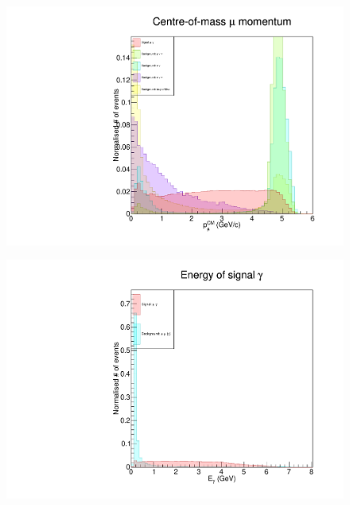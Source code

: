\documentclass[12pt]{thesis}  %
\begin{document}
\begin{figure}[h]
\centering
\begin{minipage}{.5\textwidth}
  \centering
  \includegraphics[width=\linewidth]{images/taupair-muCM_P.pdf}
  \label{fig:test1}
\end{minipage}%
\begin{minipage}{.5\textwidth}
  \centering
  \includegraphics[width=\linewidth]{images/mupair-gamma_E.pdf}
  \label{fig:test2}
\end{minipage}
\end{figure}
\end{document}

